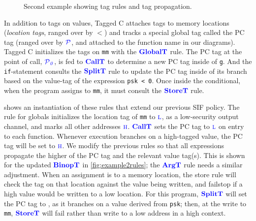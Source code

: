 \begin{figure}[t]
\caption{Second example showing tag rules and tag propagation.}
\label{ch4:fig:ex2}
\end{figure}

In addition to tags on values, Tagged C attaches tags to memory locations ({\em location tags}, ranged over by
\(\lt\)) and tracks a special global tag called the PC tag (ranged over by \(\PCT\), and attached to the
function name in our diagrams).
Tagged C initializes the tags on {\tt mm} with the \(\globaltname\) rule. The PC tag
at the point of call, \(\PCT[_0]\), is fed to \(\calltname\) to determine a new PC tag
inside of {\tt g}.
And the {\tt if}-statement consults the \(\splittname\) rule to update the PC tag
inside of its branch based on the value-tag of the expression {\tt psk < 0}. Once inside the
conditional, when the program assigns to {\tt mm}, it must consult the \(\storetname\) rule.

 shows an instantiation of these rules that extend our previous SIF policy.
The rule for globals initializes the location tag of {\tt mm} to \(\low\),
as a low-security output channel, and marks all other addresses \(\high\).
\(\calltname\) sets the PC tag to \(\low\) on entry to each function.
Whenever execution branches on
a high-tagged value, the PC tag will be set to \(\high\). We modify the previous rules so that
all expressions propagate the higher of the PC tag and the relevant value tag(s). This is shown
for the updated \(\binoptname\) in \cref{fig:example2rules}; the \(\argtname\) rule needs a similar
adjustment.
When an assignment is to a memory location, the store rule will check the tag on
that location against the value being written, 
and failstop if a high value would be written to a low location.
For this program, \(\splittname\) will set the PC tag to \high, as it branches on a value derived
from {\tt psk}; 
then, at the write to {\tt mm}, \(\storetname\) will fail rather than write to a low address
in a high context.

